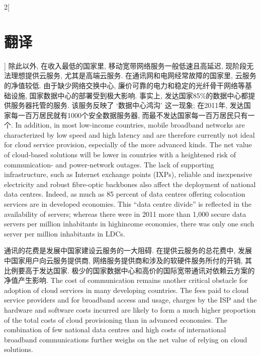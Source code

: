 \documentclass[a4paper, UTF8, 12pt]{article}
\begin{document}
\begin{paracol}{2}[\section{翻译}]
    \switchcolumn*
    除此以外, 在收入最低的国家里, 移动宽带网络服务一般低速且高延迟, 现阶段无法理想提供云服务, 尤其是高端云服务. 在通讯网和电网经常故障的国家里, 云服务的净值较低. 由于缺少网络交换中心, 廉价可靠的电力和稳定的光纤骨干网络等基础设施, 国家数据中心的部署受到极大影响. 事实上, 发达国家85\%的数据中心都提供服务器托管的服务. 该服务反映了 `数据中心鸿沟' 这一现象; 在2011年, 发达国家每一百万居民就有1000个安全数据服务器, 而最不发达国家每一百万居民只有一个.
    \switchcolumn
    \hypertarget{par:01}{}
    In addition, in most low-income countries, mobile broadband networks are characterized by low speed and high latency and are therefore currently not ideal for cloud service provision, especially of the more advanced kinds. The net value of cloud-based solutions will be lower in countries with a heightened risk of communication- and power-network outages. The lack of supporting infrastructure, such as Internet exchange points (IXPs), reliable and inexpensive electricity and robust fibre-optic backbones also affect the deployment of national data centres. Indeed, as much as 85 percent of data centres offering colocation services are in developed economies. This “data centre divide” is reflected in the availability of servers; whereas there were in 2011 more than 1,000 secure data servers per million inhabitants in highincome economies, there was only one such server per million inhabitants in LDCs.

    \switchcolumn*
    通讯的花费是发展中国家建设云服务的一大阻碍. 在提供云服务的总花费中, 发展中国家用户向云服务提供商, 网络服务提供商和涉及的软硬件服务所付的开销, 其比例要高于发达国家. 极少的国家数据中心和高价的国际宽带通讯对依赖云方案的净值产生影响.
    \switchcolumn
    The cost of communication remains another critical obstacle for adoption of cloud services in many developing countries. The fees paid to cloud service providers and for broadband access and usage, charges by the ISP and the hardware and software costs incurred are likely to form a much higher proportion of the total costs of cloud provisioning than in advanced economies. The combination of few national data centres and high costs of international broadband communications further weighs on the net value of relying on cloud solutions. 

    \switchcolumn*
    \paragraph{} 
    \switchcolumn

\end{paracol}
\end{document}

